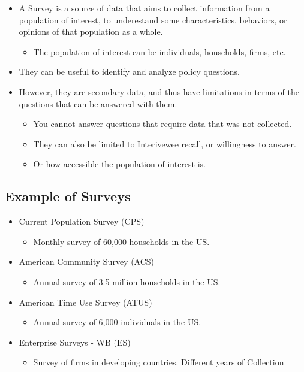 \documentclass[
  letterpaper,
  DIV=11,
  numbers=noendperiod]{scrartcl}
\providecommand{\tightlist}{%
  \setlength{\itemsep}{0pt}\setlength{\parskip}{0pt}}\usepackage{longtable,booktabs,array}
\begin{document}
\begin{itemize}
\tightlist
\item
  A Survey is a source of data that aims to collect information from a
  population of interest, to underestand some characteristics,
  behaviors, or opinions of that population as a whole.

  \begin{itemize}
  \tightlist
  \item
    The population of interest can be individuals, households, firms,
    etc.
  \end{itemize}
\item
  They can be useful to identify and analyze policy questions.
\item
  However, they are secondary data, and thus have limitations in terms
  of the questions that can be answered with them.

  \begin{itemize}
  \tightlist
  \item
    You cannot answer questions that require data that was not
    collected.
  \item
    They can also be limited to Interivewee recall, or willingness to
    answer.
  \item
    Or how accessible the population of interest is.
  \end{itemize}
\end{itemize}

\subsection{Example of Surveys}\label{example-of-surveys}

\begin{itemize}
\tightlist
\item
  Current Population Survey (CPS)

  \begin{itemize}
  \tightlist
  \item
    Monthly survey of 60,000 households in the US.
  \end{itemize}
\item
  American Community Survey (ACS)

  \begin{itemize}
  \tightlist
  \item
    Annual survey of 3.5 million households in the US.
  \end{itemize}
\item
  American Time Use Survey (ATUS)

  \begin{itemize}
  \tightlist
  \item
    Annual survey of 6,000 individuals in the US.
  \end{itemize}
\item
  Enterprise Surveys - WB (ES)

  \begin{itemize}
  \tightlist
  \item
    Survey of firms in developing countries. Different years of
    Collection
  \end{itemize}
\end{itemize}
\end{document}
